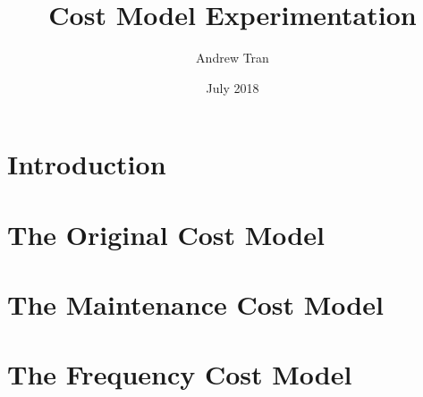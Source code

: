 \documentclass[12pt]{article}
\title{Cost Model Experimentation}
\author{Andrew Tran}
\date{July 2018}
\begin{document}
\maketitle

\section{Introduction}


\section{The Original Cost Model}


\section{The Maintenance Cost Model}


\section{The Frequency Cost Model}

\end{document}
